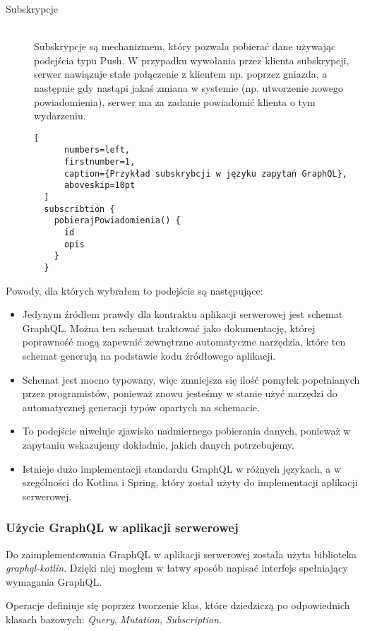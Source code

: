 \begin{description}
\item[Subskrypcje] \hfill \\ Subskrypcje są mechanizmem, który pozwala pobierać dane używając podejścia typu Push. W przypadku wywołania przez klienta subskrypcji, serwer nawiązuje stałe połączenie z klientem np. poprzez gniazda, a następnie gdy nastąpi jakaś zmiana w systemie (np. utworzenie nowego powiadomienia), serwer ma za zadanie powiadomić klienta o tym wydarzeniu.
  \begin{addmargin}[6mm]{0mm}
  \begin{lstlisting}[
      numbers=left,
      firstnumber=1,
      caption={Przykład subskrybcji w języku zapytań GraphQL},
      aboveskip=10pt
  ]
  subscribtion {
    pobierajPowiadomienia() {
      id
      opis
    }
  }
  \end{lstlisting}
  \end{addmargin}
\end{description}
Powody, dla których wybrałem to podejście są następujące:
\begin{itemize}
  \item Jedynym źródłem prawdy dla kontraktu aplikacji serwerowej jest schemat GraphQL. Można ten schemat traktować jako dokumentację, której poprawność mogą zapewnić zewnętrzne automatyczne narzędzia, które ten schemat generują na podstawie kodu źródłowego aplikacji.
  \item Schemat jest mocno typowany, więc zmniejsza się ilość pomyłek popełnianych przez programistów, ponieważ znowu jesteśmy w stanie użyć narzędzi do automatycznej generacji typów opartych na schemacie.
  \item To podejście niweluje zjawisko nadmiernego pobierania danych, ponieważ w zapytaniu wskazujemy dokładnie, jakich danych potrzebujemy.
  \item Istnieje dużo implementacji standardu GraphQL w różnych językach, a w szególności do Kotlina i Spring, który został użyty do implementacji aplikacji serwerowej.
\end{itemize}

\subsubsection{Użycie GraphQL w aplikacji serwerowej}
Do zaimplementowania GraphQL w aplikacji serwerowej została użyta biblioteka \emph{graphql-kotlin}. Dzięki niej mogłem w łatwy sposób napisać interfejs spełniający wymagania GraphQL.

Operacje definiuje się poprzez tworzenie klas, które dziedziczą po odpowiednich klasach bazowych: \emph{Query}, \emph{Mutation}, \emph{Subscription}.

